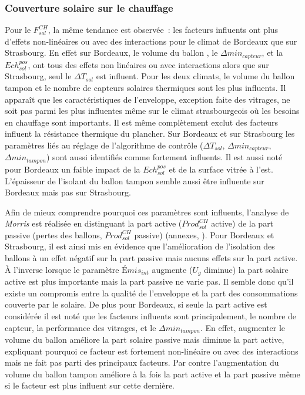 \subsubsection{Couverture solaire sur le chauffage} %
\label{ssub:couverture_solaire_sur_le_chauffage}
Pour le $F_{sol}^{CH}$, la même tendance est observée~: les facteurs influents ont plus
d’effets non-linéaires ou avec des interactions pour le climat de Bordeaux que sur
Strasbourg. En effet sur Bordeaux, le volume du ballon , le $\Delta
min_{capteur}$, et la $Ech_{sol}^{pos}$, ont tous des effets non linéaires ou avec
interactions alors que sur Strasbourg, seul le $\Delta T_{sol}$ est influent. Pour les
deux climats, le volume du ballon tampon et le nombre de capteurs solaires thermiques sont
les plus influents. Il apparaît que les caractéristiques de l’enveloppe, exception faite
des vitrages, ne soit pas parmi les plus influentes même sur le climat strasbourgeois où
les besoins en chauffage sont importants. Il est même complètement exclut des facteurs
influent la résistance thermique du plancher. Sur Bordeaux et sur Strasbourg les
paramètres liés au réglage de l’algorithme de contrôle ($\Delta T_{sol}$, $\Delta
min_{capteur}$, $\Delta min_{tampon}$) sont aussi identifiés comme fortement influents. Il
est aussi noté pour Bordeaux un faible impact de la $Ech_{sol}^{pos}$ et de la surface
vitrée à l’est. L’épaisseur de l’isolant du ballon tampon semble aussi être influente sur
Bordeaux mais pas sur Strasbourg.

Afin de mieux comprendre pourquoi ces paramètres sont influents, l’analyse de
\textit{Morris} est réalisée en distinguant la part active ($Prod_{sol}^{CH}$ active) de
la part passive (pertes des ballons, $Prod_{sol}^{CH}$ passive) (annexes,
). Pour Bordeaux et Strasbourg, il est ainsi mis en
évidence que l’amélioration de l’isolation des ballons à un effet négatif sur la part
passive mais aucuns effets sur la part active. À l’inverse lorsque le paramètre
$Émis_{int}$ augmente ($U_{g}$ diminue) la part solaire active est plus importante mais la
part passive ne varie pas. Il semble donc qu’il existe un compromis entre la qualité de
l’enveloppe et la part des consommations couverte par le solaire. De plus pour Bordeaux,
si seule la part active est considérée il est noté que les facteurs influents sont
principalement, le nombre de capteur, la performance des vitrages, et le $\Delta
min_{tampon}$. En effet, augmenter le volume du ballon  améliore la part solaire
passive mais diminue la part active, expliquant pourquoi ce facteur est fortement
non-linéaire ou avec des interactions mais ne fait pas parti des principaux facteurs. Par
contre l’augmentation du volume du ballon tampon améliore à la fois la part active et la
part passive même si le facteur est plus influent sur cette dernière.

